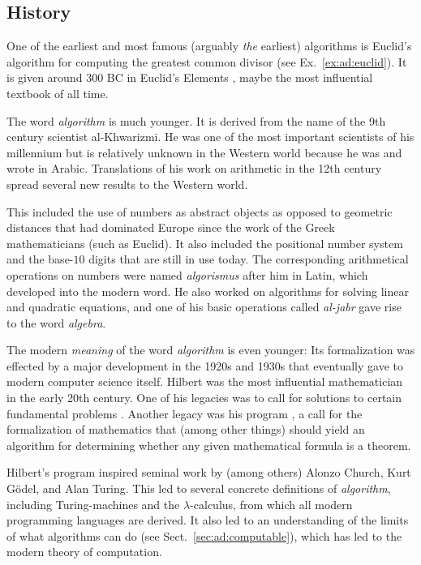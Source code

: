 \subsection{History}\label{sec:ad:history}

One of the earliest and most famous (arguably \emph{the} earliest) algorithms is Euclid's algorithm for computing the greatest common divisor (see Ex.~\ref{ex:ad:euclid}).
It is given around 300 BC in Euclid's Elements \cite[Book VII, Proposition 2]{elements}, maybe the most influential textbook of all time.
\medskip

The word \emph{algorithm} is much younger.
It is derived from the name of the 9th century scientist al-Khwarizmi.
He was one of the most important scientists of his millennium but is relatively unknown in the Western world because he was and wrote in Arabic.
Translations of his work on arithmetic in the 12th century spread several new results to the Western world.

This included the use of numbers as abstract objects as opposed to geometric distances that had dominated Europe since the work of the Greek mathematicians (such as Euclid).
It also included the positional number system and the base-$10$ digits that are still in use today.
The corresponding arithmetical operations on numbers were named \emph{algorismus} after him in Latin, which developed into the modern word.
He also worked on algorithms for solving linear and quadratic equations, and one of his basic operations called \emph{al-jabr} gave rise to the word \emph{algebra}.
\medskip

The modern \emph{meaning} of the word \emph{algorithm} is even younger: Its formalization was effected by a major development in the 1920s and 1930s that eventually gave to modern computer science itself.
Hilbert was the most influential mathematician in the early 20th century.
One of his legacies was to call for solutions to certain fundamental problems \cite{hilbertsproblems}.
Another legacy was his program \cite{hilbertsprogram}, a call for the formalization of mathematics that (among other things) should yield an algorithm for determining whether any given mathematical formula is a theorem.

Hilbert's program inspired seminal work by (among others) Alonzo Church, Kurt G\"odel, and Alan Turing.
This led to several concrete definitions of \emph{algorithm}, including Turing-machines and the $\lambda$-calculus, from which all modern programming languages are derived.
It also led to an understanding of the limits of what algorithms can do (see Sect.~\ref{sec:ad:computable}), which has led to the modern theory of computation.

